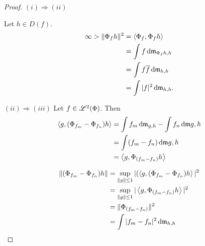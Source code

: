 \begin{proof}
 $(i) \Rightarrow (ii)$
 
 Let $h \in D(f)$.
 \begin{align*}
   \infty > \|\Phi_f h\| ^2 &= \left\langle  \Phi_f , \Phi_f h \right\rangle \\
   &= \int f \operatorname{d}\! \mathfrak{m}_{\Phi_f h, h} \\
   &= \int f \overline{f} \operatorname{d}\! \mathfrak{m}_{h,h} \\
   &= \int | f | ^2 \operatorname{d}\! \mathfrak{m}_{h,h}.
 \end{align*}

 
  $(ii) \Rightarrow (iii)$
  Let $f \in \mathscr{L}^2(\Phi)$. Then 
  \begin{align*}
    \left\langle g, (\Phi_{f_m} - \Phi_{f_n})h \right\rangle &= \int f_m \operatorname{d}\! \mathfrak{m}_{g,h} - \int f_n \operatorname{d}\! \mathfrak{m}{g,h} \\
    &= \int (f_m - f_n) \operatorname{d}\! \mathfrak{m}{g,h} \\
    &= \left\langle g, \Phi_{(f_m - f_n)} h  \right\rangle
  \end{align*}
  
  \begin{align*}
    \|(\Phi_{f_m} - \Phi_{f_n}) h \| &=   \sup_{\|g\| \leq 1} 
    |(\left\langle g, (\Phi_{f_m} - \Phi_{f_n})h \right\rangle|^2 \\
    &= \sup_{\|g\| \leq 1} |\left\langle g, \Phi_{(f_m - f_n)}h \right\rangle| ^2 \\
    &= \| \Phi_{(f_m - f_n)} \| ^2\\
    &= \int |f_m - f_n|^2 \operatorname{d}\! \mathfrak{m}_{h,h}
  \end{align*}


\end{proof}

























